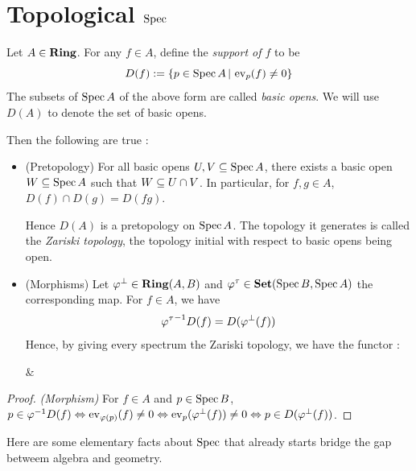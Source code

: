 \section{Topological $\operatorname{Spec}$}

\begin{prop}
  
  Let $A \in \mathbf{Ring}$.
  For any $f \in A$, 
  define the \emph{support of $f$} to be \[
    D(f) := \left\{p \in \operatorname{Spec} A \,|\, \operatorname{ev}_p(f) \neq 0\right\}
  \]
  The subsets of $\operatorname{Spec} A$ of the above form are called 
  \emph{basic opens}.
  We will use $D(A)$ to denote the set of basic opens. 

  Then the following are true : 
  \begin{itemize}
    \item (Pretopology)
    For all basic opens $U, V \subseteq \operatorname{Spec} A$,
    there exists a basic open $W \subseteq \operatorname{Spec} A$ such that $W \subseteq U \cap V$.
    In particular, for $f, g \in A$, $D(f) \cap D(g) = D(fg)$.

    Hence $D(A)$ is a pretopology on $\operatorname{Spec} A$.
    The topology it generates is called the \emph{Zariski topology},
    the topology initial with respect to basic opens being open. 

    \item (Morphisms)
    Let $\varphi^\bot \in \mathbf{Ring}(A,B)$ and 
    $\varphi^\tau \in \mathbf{Set}(\operatorname{Spec} B, \operatorname{Spec} A)$ the corresponding map. 
    For $f \in A$, 
    we have \[
      {\varphi^\tau}^{-1} D(f) = D(\varphi^\bot(f))
    \]
    Hence, by giving every spectrum the Zariski topology, 
    we have the functor : 
    \begin{cd}
      \RING\op \ar[r,"\spec"] & \TOP 
    \end{cd}
  \end{itemize}

\end{prop}
\begin{proof}
  \textit{(Morphism)}
  For $f \in A$ and $p \in \operatorname{Spec} B$,
  $p \in \varphi^{-1} D(f) \Leftrightarrow \operatorname{ev}_{\varphi(p)}(f) \neq 0 
  \Leftrightarrow \operatorname{ev}_p(\varphi^\bot(f)) \neq 0
  \Leftrightarrow p \in D(\varphi^\bot(f))$.
\end{proof}

\begin{rmk}
  Here are some elementary facts about $\operatorname{Spec}$ 
  that already starts bridge the gap betweem algebra and geometry.
\end{rmk}

